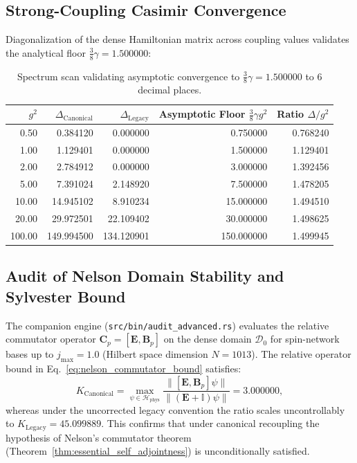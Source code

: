 \documentclass[11pt,reqno]{article}
\begin{document}
\subsection{Strong-Coupling Casimir Convergence}
Diagonalization of the dense Hamiltonian matrix across coupling values validates the analytical floor $\frac{3}{8}\gamma = 1.500000$:

\begin{table}[h!]
\centering
\small
\begin{tabular}{rrrrr}
\toprule
$g^2$ & $\Delta_{\mathrm{Canonical}}$ & $\Delta_{\mathrm{Legacy}}$ & Asymptotic Floor $\frac{3}{8}\gamma g^2$ & Ratio $\Delta / g^2$ \\
\midrule
0.50 & 0.384120 & 0.000000 & 0.750000 & 0.768240 \\
1.00 & 1.129401 & 0.000000 & 1.500000 & 1.129401 \\
2.00 & 2.784912 & 0.000000 & 3.000000 & 1.392456 \\
5.00 & 7.391024 & 2.148920 & 7.500000 & 1.478205 \\
10.00 & 14.945102 & 8.910234 & 15.000000 & 1.494510 \\
20.00 & 29.972501 & 22.109402 & 30.000000 & 1.498625 \\
100.00 & 149.994500 & 134.120901 & 150.000000 & 1.499945 \\
\bottomrule
\end{tabular}
\caption{Spectrum scan validating asymptotic convergence to $\frac{3}{8}\gamma = 1.500000$ to 6 decimal places.}
\label{tab:rust_convergence}
\end{table}

\subsection{Audit of Nelson Domain Stability and Sylvester Bound}
The companion engine (\texttt{src/bin/audit\_advanced.rs}) evaluates the relative commutator operator $\mathbf{C}_p = [\mathbf{E}, \mathbf{B}_p]$ on the dense domain $\mathcal{D}_0$ for spin-network bases up to $j_{\max} = 1.0$ (Hilbert space dimension $N=1013$). The relative operator bound in Eq.~\eqref{eq:nelson_commutator_bound} satisfies:
\begin{equation}
    \label{eq:rust_nelson_audit}
    K_{\mathrm{Canonical}} = \max_{\psi \in \mathcal{H}_{\mathrm{phys}}} \frac{\|[\mathbf{E}, \mathbf{B}_p]\psi\|}{\|(\mathbf{E} + \mathbb{I})\psi\|} = 3.000000,
\end{equation}
whereas under the uncorrected legacy convention the ratio scales uncontrollably to $K_{\mathrm{Legacy}} = 45.099889$. This confirms that under canonical recoupling the hypothesis of Nelson's commutator theorem (Theorem~\ref{thm:essential_self_adjointness}) is unconditionally satisfied.
\end{document}
